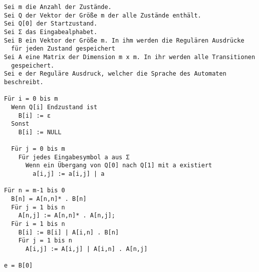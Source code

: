\lstset{language=C, basicstyle=\footnotesize}
\begin{lstlisting}
Sei m die Anzahl der Zustände.
Sei Q der Vektor der Größe m der alle Zustände enthält.
Sei Q[0] der Startzustand.
Sei Σ das Eingabealphabet.
Sei B ein Vektor der Größe m. In ihm werden die Regulären Ausdrücke
  für jeden Zustand gespeichert
Sei A eine Matrix der Dimension m x m. In ihr werden alle Transitionen
  gespeichert.
Sei e der Reguläre Ausdruck, welcher die Sprache des Automaten beschreibt.
  
Für i = 0 bis m
  Wenn Q[i] Endzustand ist
    B[i] := ε
  Sonst
    B[i] := NULL
	
  Für j = 0 bis m
    Für jedes Eingabesymbol a aus Σ
      Wenn ein Übergang von Q[0] nach Q[1] mit a existiert
        a[i,j] := a[i,j] | a
	
Für n = m-1 bis 0
  B[n] = A[n,n]* . B[n]
  Für j = 1 bis n
    A[n,j] := A[n,n]* . A[n,j];
  Für i = 1 bis n
    B[i] := B[i] | A[i,n] . B[n]
    Für j = 1 bis n
      A[i,j] := A[i,j] | A[i,n] . A[n,j]
      
e = B[0]
\end{lstlisting}

